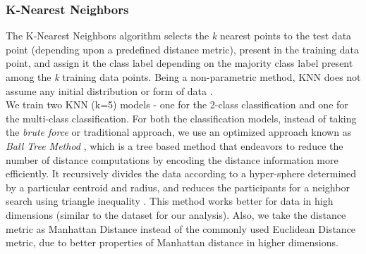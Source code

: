 \subsubsection{K-Nearest Neighbors}
The K-Nearest Neighbors algorithm selects the {\em k} nearest points to the test data point (depending upon a predefined distance metric), present in the training data point, and assign it the class label depending on the majority class label present among the {\em k} training data points. Being a non-parametric method, KNN does not assume any initial distribution or form of data \cite{islr09}.\\
We train two KNN (k=5) models - one for the 2-class classification and one for the multi-class classification. For both the classification models, instead of taking the {\em brute force} or traditional approach, we use an optimized approach known as {\em Ball Tree Method} \cite{scikit12}, which is a tree based method that endeavors to reduce the number of distance computations by encoding the distance information more efficiently. It recursively divides the data according to a hyper-sphere determined by a particular centroid and radius, and reduces the participants for a neighbor search using triangle inequality \cite{scikit12}. This method works better for data in high dimensions (similar to the dataset for our analysis). Also, we take the distance metric as Manhattan Distance instead of the commonly used Euclidean Distance metric, due to better properties of Manhattan distance in higher dimensions.

